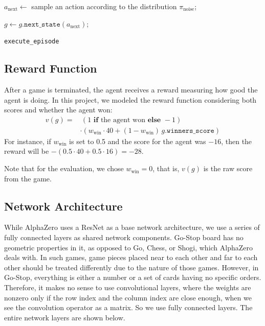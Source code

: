 \documentclass[10pt,twocolumn,letterpaper]{article}
\begin{document}
\begin{algorithm}
{{         $a_\text{next}\longleftarrow$ sample an action according to the distribution $\pi_\textrm{noise}$;

         $g\longleftarrow g\texttt{.next\_state}(a_\text{next})$;
      }


      \Return{$\tilde\ell$}
}
\vspace*{1em}
\caption{\texttt{execute\_episode}}
\label{alg:execute-episode}
\end{algorithm}

\subsection{Reward Function}
After a game is terminated, the agent receives a reward measuring how good the agent is doing. In this project, we modeled the reward function considering both scores and whether the agent won:
\begin{align*}
   v(g) =&\, (1\textbf{ if }\text{the agent won}\textbf{ else }-1)
   \\&\cdot (w_\text{win}\cdot 40  + (1-w_\text{win})\,g.\texttt{winners\_score})
\end{align*}
For instance, if $w_\text{win}$ is set to 0.5 and the score for the agent was $-16$, then the reward will be $-(0.5\cdot 40 + 0.5\cdot 16) = -28$.

Note that for the evaluation, we chose $w_\text{win}=0$, that is, $v(g)$ is the raw score from the game.

\subsection{Network Architecture}
While AlphaZero uses a ResNet as a base network architecture, we use a series of fully connected layers as shared network components. Go-Stop board has no geometric properties in it, as opposed to Go, Chess, or Shogi, which AlphaZero deals with. In such games, game pieces placed near to each other and far to each other should be treated differently due to the nature of those games. However, in Go-Stop, everything is either a number or a set of cards having no specific orders. Therefore, it makes no sense to use convolutional layers, where the weights are nonzero only if the row index and the column index are close enough, when we see the convolution operator as a matrix. So we use fully connected layers. The entire network layers are shown below.
\end{document}
